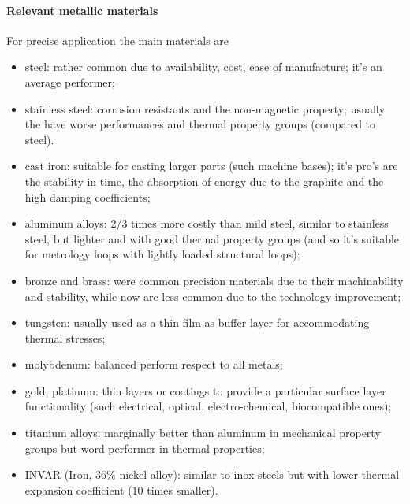 	\paragraph{Relevant metallic materials} For precise application the main materials are 
	\begin{itemize}
		\item steel: rather common due to availability, cost, ease of manufacture; it's an average performer;
		
		\item stainless steel: corrosion resistants and the non-magnetic property; usually the have worse performances and thermal property groups (compared to steel).
		
		\item cast iron: suitable for casting larger parts (such machine bases); it's pro's are the stability in time, the absorption of energy due to the graphite and the high damping coefficients;
		
		\item aluminum alloys: 2/3 times more costly than mild steel, similar to stainless steel, but lighter and with good thermal property groups (and so it's suitable for metrology loops  with lightly loaded structural loops);
		
		\item bronze and brass: were common precision materials due to their machinability and stability, while now are less common due to the technology improvement;
		
		\item tungsten: usually used as a thin film as buffer layer for accommodating thermal stresses;
		
		\item molybdenum: balanced perform respect to all metals;
		
		\item gold, platinum: thin layers or coatings to provide a particular surface layer functionality (such electrical, optical, electro-chemical, biocompatible ones);
		
		\item titanium alloys: marginally better than aluminum in mechanical property groups but word performer in thermal properties;
		
		\item INVAR (Iron, $36\%$ nickel alloy): similar to inox steels but with lower thermal expansion coefficient ($10$ times smaller).
	\end{itemize}
	
